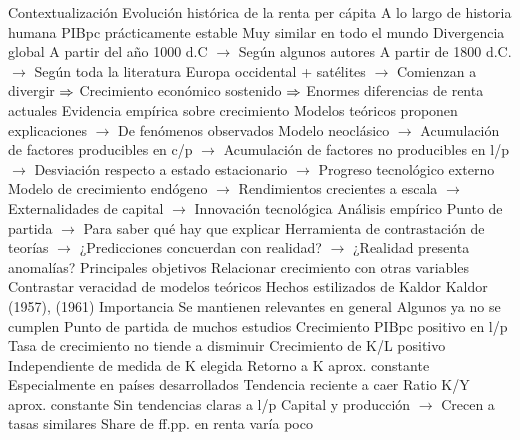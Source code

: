 \documentclass{nuevotema}
\begin{document}
\esquemalargo

















\begin{esquemal}
	\1[] 
		\2 Contextualización
			\3 Evolución histórica de la renta per cápita
				\4 A lo largo de historia humana
				\4[] PIBpc prácticamente estable
				\4[] Muy similar en todo el mundo
				\4 Divergencia global
				\4[] A partir del año 1000 d.C
				\4[] $\to$ Según algunos autores
				\4[] A partir de 1800 d.C.
				\4[] $\to$ Según toda la literatura
				\4[] Europa occidental + satélites
				\4[] $\to$ Comienzan a divergir
				\4[] $\Rightarrow$ Crecimiento económico sostenido
				\4[] $\Rightarrow$ Enormes diferencias de renta actuales
			\3 Evidencia empírica sobre crecimiento
				\4 Modelos teóricos proponen explicaciones
				\4[] $\to$ De fenómenos observados
				\4[] Modelo neoclásico
				\4[] $\to$ Acumulación de factores producibles en c/p
				\4[] $\to$ Acumulación de factores no producibles en l/p
				\4[] $\to$ Desviación respecto a estado estacionario
				\4[] $\to$ Progreso tecnológico externo
				\4[] Modelo de crecimiento endógeno
				\4[] $\to$ Rendimientos crecientes a escala
				\4[] $\to$ Externalidades de capital
				\4[] $\to$ Innovación tecnológica
				\4 Análisis empírico
				\4[] Punto de partida
				\4[] $\to$ Para saber qué hay que explicar
				\4[] Herramienta de contrastación de teorías
				\4[] $\to$ ¿Predicciones concuerdan con realidad?
				\4[] $\to$ ¿Realidad presenta anomalías?
				\4 Principales objetivos
				\4[] Relacionar crecimiento con otras variables
				\4[] Contrastar veracidad de modelos teóricos
			\3 Hechos estilizados de Kaldor
				\4 Kaldor (1957), (1961)
				\4 Importancia
				\4[] Se mantienen relevantes en general
				\4[] Algunos ya no se cumplen
				\4 Punto de partida de muchos estudios
				\4[I] Crecimiento PIBpc positivo en l/p
				\4[] Tasa de crecimiento no tiende a disminuir
				\4[II] Crecimiento de K/L positivo
				\4[] Independiente de medida de K elegida
				\4[III] Retorno a K aprox. constante
				\4[] Especialmente en países desarrollados
				\4[] Tendencia reciente a caer
				\4[IV] Ratio K/Y aprox. constante
				\4[] Sin tendencias claras a l/p
				\4[] Capital y producción
				\4[] $\to$ Crecen a tasas similares
				\4[V] Share de ff.pp. en renta varía poco

\end{esquemal}
\end{document}

